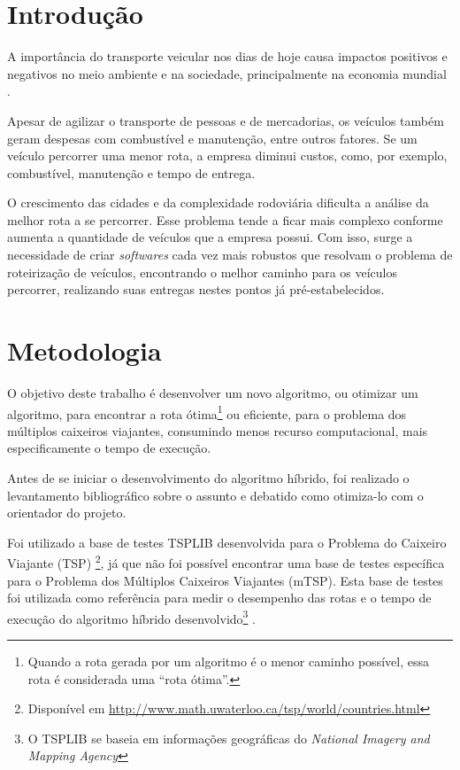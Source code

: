 \documentclass[12pt,openright,a4paper,oneside]{tcc}
\begin{document}
	\chapter{Introdução}
		
		A importância do transporte veicular nos dias de hoje causa impactos positivos e negativos 
	    no meio ambiente e na sociedade, principalmente na economia mundial \cite{meioAmbiente}. 
		
		Apesar de agilizar o transporte de pessoas e  de mercadorias, 
		os veículos também geram despesas com combustível e manutenção, entre outros fatores. 
		Se um veículo percorrer uma menor rota, a empresa diminui custos, como, por exemplo, 
		combustível, manutenção e tempo de entrega.

		O crescimento das cidades e da complexidade rodoviária dificulta a análise da melhor rota a se percorrer. Esse problema tende a ficar mais complexo conforme aumenta a quantidade de veículos que a empresa possui. Com isso, surge a necessidade de criar 
		\textit{softwares} cada vez mais robustos que resolvam o problema de roteirização de veículos, encontrando o melhor caminho para os veículos percorrer, realizando suas entregas nestes pontos já pré-estabelecidos.


	\chapter{Metodologia}

		O objetivo deste trabalho é desenvolver um novo algoritmo, ou otimizar um algoritmo, para encontrar a rota ótima\footnote{Quando a rota gerada por um algoritmo é o menor caminho possível, essa rota é considerada uma ``rota ótima''.} ou eficiente, para o problema dos múltiplos caixeiros viajantes, consumindo menos recurso computacional, mais especificamente o tempo de execução. 

		Antes de se iniciar o desenvolvimento do algoritmo híbrido, foi realizado o levantamento bibliográfico sobre o assunto e debatido como otimiza-lo com o orientador do projeto.

		Foi utilizado a base de testes TSPLIB desenvolvida para o Problema do Caixeiro Viajante (TSP) \footnote{Disponível em \url{http://www.math.uwaterloo.ca/tsp/world/countries.html}}, já que não foi possível encontrar uma base de testes específica para o Problema dos Múltiplos Caixeiros Viajantes (mTSP). Esta base de testes foi utilizada como referência para medir o desempenho das rotas e o tempo de execução do algoritmo híbrido desenvolvido\footnote{O TSPLIB se baseia em informações geográficas do \textit{National Imagery and Mapping Agency}} \cite{tsplib}.
\end{document}

